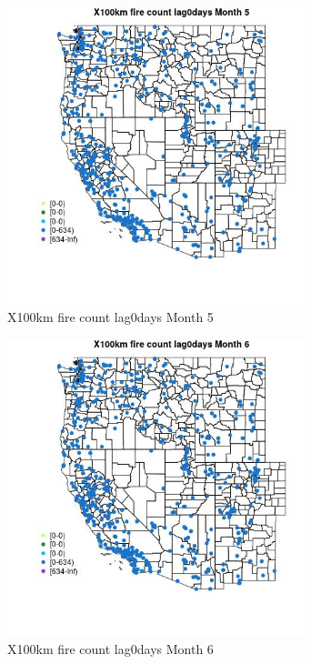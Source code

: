 \begin{figure} 
\centering  
\includegraphics[width=0.77\textwidth]{Code_Outputs/Report_ML_input_PM25_Step4_part_e_de_duplicated_aves_compiled_2019-05-14wNAs_MapObsMo5X100km_fire_count_lag0days.jpg} 
\caption{\label{fig:Report_ML_input_PM25_Step4_part_e_de_duplicated_aves_compiled_2019-05-14wNAsMapObsMo5X100km_fire_count_lag0days}X100km fire count lag0days Month 5} 
\end{figure} 
 

\begin{figure} 
\centering  
\includegraphics[width=0.77\textwidth]{Code_Outputs/Report_ML_input_PM25_Step4_part_e_de_duplicated_aves_compiled_2019-05-14wNAs_MapObsMo6X100km_fire_count_lag0days.jpg} 
\caption{\label{fig:Report_ML_input_PM25_Step4_part_e_de_duplicated_aves_compiled_2019-05-14wNAsMapObsMo6X100km_fire_count_lag0days}X100km fire count lag0days Month 6} 
\end{figure} 
 


